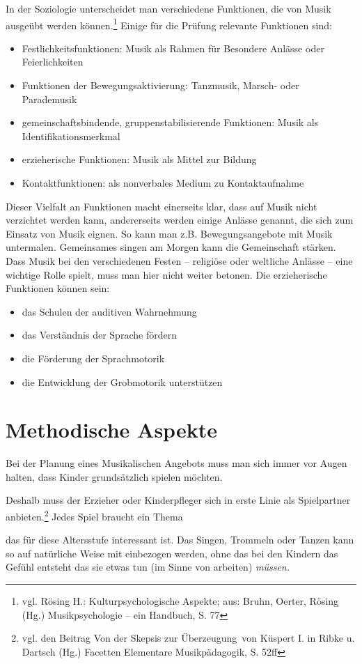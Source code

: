 \documentclass[10pt,a4paper,twoside]{report}
\newcommand{\comment}[1]{
	\marginpar{
		\textsf{#1}
	}
}
\begin{document}
In der Soziologie unterscheidet man verschiedene Funktionen, die von Musik ausgeübt werden 
können.\footnote{vgl. Rösing H.: Kulturpsychologische Aspekte; aus: Bruhn, Oerter, Rösing (Hg.) Musikpsychologie --
ein Handbuch, S. 77}
Einige für die Prüfung relevante Funktionen sind:
\begin{itemize}
	\item Festlichkeitsfunktionen: Musik als Rahmen für Besondere Anlässe oder Feierlichkeiten
	\item Funktionen der Bewegungsaktivierung: Tanzmusik, Marsch- oder Parademusik
	\item gemeinschaftsbindende, gruppenstabilisierende Funktionen: Musik als Identifikationsmerkmal
	\item erzieherische Funktionen: Musik als Mittel zur Bildung
	\item Kontaktfunktionen: als nonverbales Medium zu Kontaktaufnahme 
\end{itemize}
Dieser Vielfalt an Funktionen macht einerseits klar, dass auf Musik nicht verzichtet werden kann, andererseits
werden einige Anlässe genannt, die sich zum Einsatz von Musik eignen. So kann man z.B. Bewegungsangebote
mit Musik untermalen. Gemeinsames singen am Morgen kann die Gemeinschaft stärken. Dass Musik bei den
verschiedenen Festen -- religiöse oder weltliche Anlässe -- eine wichtige Rolle spielt, muss man
hier nicht weiter betonen. Die erzieherische Funktionen können sein:
\begin{itemize}
	\item das Schulen der auditiven Wahrnehmung
	\item das Verständnis der Sprache fördern 
	\item die Förderung der Sprachmotorik
	\item die Entwicklung der Grobmotorik unterstützen
\end{itemize}


\section{Methodische Aspekte}
Bei der Planung eines Musikalischen Angebots muss man sich immer vor Augen halten,
dass Kinder grundsätzlich spielen möchten.\comment{Spielpartner}
Deshalb muss der Erzieher oder Kinderpfleger sich in erste Linie als 
Spielpartner anbieten.\footnote{vgl. den Beitrag \glqq Von der 
	Skepsis zur Überzeugung\grqq\ von Küspert I. in Ribke u. Dartsch (Hg.) Facetten Elementare
	Musikpädagogik, S. 52ff} Jedes Spiel braucht ein Thema\comment{Spiel -- Thema}
das für diese 
Altersstufe interessant ist. Das Singen, Trommeln oder Tanzen kann so auf
natürliche Weise mit einbezogen werden, ohne das bei den Kindern das Gefühl
entsteht das sie etwas tun (im Sinne von arbeiten) \emph{müssen.}
\end{document}
